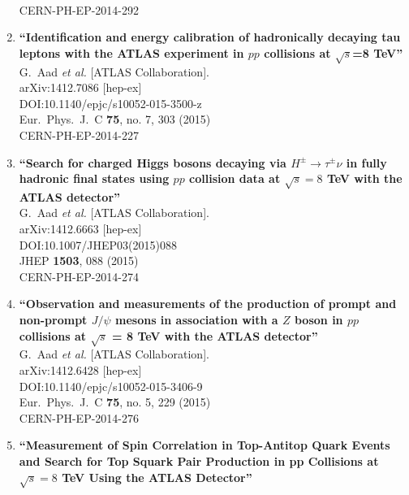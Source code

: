 \documentclass{article}
\begin{document}
\begin{enumerate}
  \\{}CERN-PH-EP-2014-292
\item%
{\bf ``Identification and energy calibration of hadronically decaying tau leptons with the ATLAS experiment in $pp$ collisions at $\sqrt{s}$=8 TeV''}
  \\{}G.~Aad {\it et al.} [ATLAS Collaboration].
  \\{}arXiv:1412.7086 [hep-ex]
  \\{}DOI:10.1140/epjc/s10052-015-3500-z
  \\{}Eur.\ Phys.\ J.\ C {\bf 75}, no. 7, 303 (2015)
  \\{}CERN-PH-EP-2014-227
\item%
{\bf ``Search for charged Higgs bosons decaying via $H^{\pm} \rightarrow \tau^{\pm}\nu$ in fully hadronic final states using $pp$ collision data at $\sqrt{s} = 8$ TeV with the ATLAS detector''}
  \\{}G.~Aad {\it et al.} [ATLAS Collaboration].
  \\{}arXiv:1412.6663 [hep-ex]
  \\{}DOI:10.1007/JHEP03(2015)088
  \\{}JHEP {\bf 1503}, 088 (2015)
  \\{}CERN-PH-EP-2014-274
\item%
{\bf ``Observation and measurements of the production of prompt and non-prompt $J/\psi$ mesons in association with a $Z$ boson in $pp$ collisions at $\sqrt{s}$ = 8 TeV with the ATLAS detector''}
  \\{}G.~Aad {\it et al.} [ATLAS Collaboration].
  \\{}arXiv:1412.6428 [hep-ex]
  \\{}DOI:10.1140/epjc/s10052-015-3406-9
  \\{}Eur.\ Phys.\ J.\ C {\bf 75}, no. 5, 229 (2015)
  \\{}CERN-PH-EP-2014-276
\item%
{\bf ``Measurement of Spin Correlation in Top-Antitop Quark Events and Search for Top Squark Pair Production in pp Collisions at $\sqrt{s}=8$ TeV Using the ATLAS Detector''}

\end{enumerate}
\end{document}
